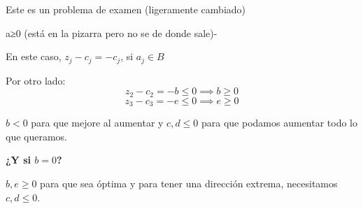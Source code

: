 \begin{problem}[7]

Este es un problema de examen (ligeramente cambiado)


\solution

a≥0 (está en la pizarra pero no se de donde sale)-

\spart 

En este caso, $z_j - c_j = -c_j$, si $a_j∈B$

Por otro lado:
\[ z_2 - c_2 = -b ≤ 0 \implies b≥0\]
\[ z_3 - c_3 = -e ≤ 0 \implies e≥0\]

\spart $b<0$ para que mejore al aumentar y $c,d≤0$ para que podamos aumentar todo lo que queramos. 

\textbf{¿Y si $b=0$?}

\spart $b,e≥0$ para que sea óptima y para tener una dirección extrema, necesitamos $c,d≤0$.

\end{problem}
